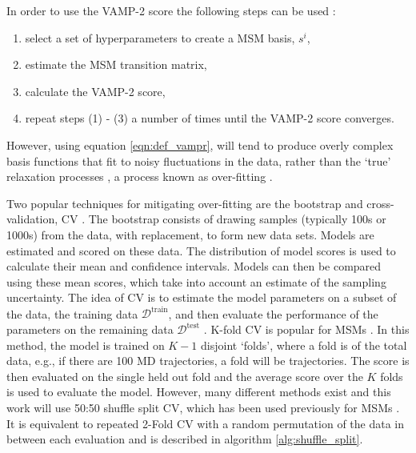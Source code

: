 In order to use the VAMP-2 score the following steps can be used  \cite{schererVariationalSelectionFeatures2019}:
\begin{enumerate}
    \item select a set of hyperparameters to create a MSM basis, $s^{i}$, 
    \item estimate the MSM transition matrix, 
    \item calculate the VAMP-2 score, 
    \item repeat steps (1) - (3) a number of times until the VAMP-2 score converges.
\end{enumerate}
However, using equation \ref{eqn:def_vampr}, will tend to produce overly complex basis functions that fit to noisy fluctuations in the data, rather than the `true' relaxation processes \cite{mcgibbonVariationalCrossvalidationSlow2015,wuVariationalApproachLearning2020c,schererVariationalSelectionFeatures2019}, a process known as over-fitting \cite{friedman2001elements}.

Two popular techniques for mitigating over-fitting \cite{friedman2001elements} are the bootstrap \cite{efronIntroductionBootstrap1993} and cross-validation, CV \cite{arlotSurveyCrossvalidationProcedures2009}. The bootstrap consists of drawing samples (typically \num{100}s or \num{1000}s) from the data, with replacement, to form new data sets. Models are estimated and scored on these data. The distribution of model scores is used to calculate their mean and confidence intervals. Models can then be compared using these mean scores, which take into account an estimate of the sampling uncertainty. The idea of CV is to estimate the model parameters on a subset of the data, the training data $\mathcal{D}^{\mathrm{train}}$, and then evaluate the performance of the parameters on the remaining data $\mathcal{D}^{\mathrm{test}}$ \cite{friedman2001elements}. K-fold CV is popular for MSMs \cite{schererVariationalSelectionFeatures2019,mcgibbonVariationalCrossvalidationSlow2015}. In this method, the model is trained on $K-1$ disjoint `folds',  where a fold is  of the total data, e.g., if there are \num{100} MD trajectories, a fold will be  trajectories. The score is then evaluated on the single held out fold and the average score over the $K$ folds is used to evaluate the model. However, many different methods exist \cite{arlotSurveyCrossvalidationProcedures2009} and this work will use 50:50 shuffle split CV, which has been used previously for MSMs \cite{chenDynamicConformationalLandscape2019,husicOptimizedParameterSelection2016}. It is equivalent to repeated 2-Fold CV with a random permutation of the data in between each evaluation and is described in algorithm \ref{alg:shuffle_split}. 

